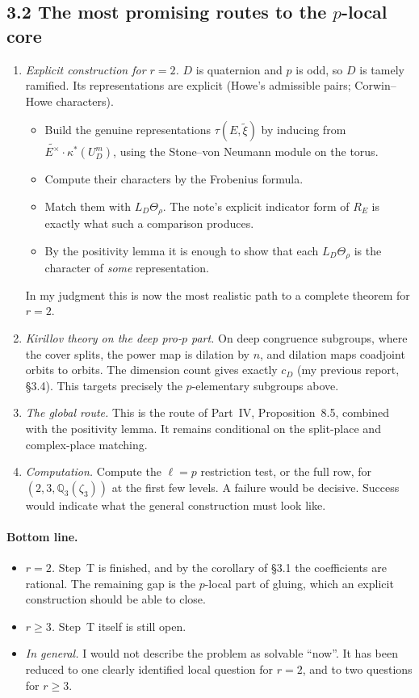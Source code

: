 \documentclass[11pt]{article}
\theoremstyle{plain}
\begin{document}
\subsection*{3.2 The most promising routes to the $p$-local core}
\begin{enumerate}[label=(\arabic*)]
\item \emph{Explicit construction for $r=2$.} $D$ is quaternion and
$p$ is odd, so $D$ is tamely ramified. Its representations are explicit
(Howe's admissible pairs; Corwin--Howe characters).
\begin{itemize}
\item Build the genuine representations $\tau(E,\tilde\xi)$ by inducing
from $\widetilde{E^\times}\cdot\kappa^*(U_D^m)$, using the
Stone--von Neumann module on the torus.
\item Compute their characters by the Frobenius formula.
\item Match them with $L_D\Theta_\rho$. The note's explicit indicator
form of $R_E$ is exactly what such a comparison produces.
\item By the positivity lemma it is enough to show that each
$L_D\Theta_\rho$ is the character of \emph{some} representation.
\end{itemize}
In my judgment this is now the most realistic path to a complete theorem
for $r=2$.
\item \emph{Kirillov theory on the deep pro-$p$ part.} On deep
congruence subgroups, where the cover splits, the power map is
dilation by $n$, and dilation maps coadjoint orbits to orbits. The
dimension count gives exactly $c_D$ (my previous report, \S3.4). This
targets precisely the $p$-elementary subgroups above.
\item \emph{The global route.} This is the route of Part~IV,
Proposition~8.5, combined with the positivity lemma. It remains
conditional on the split-place and complex-place matching.
\item \emph{Computation.} Compute the $\ell=p$ restriction test, or the
full row, for $(2,3,\mathbb Q_3(\zeta_3))$ at the first few levels. A
failure would be decisive. Success would indicate what the general
construction must look like.
\end{enumerate}

\paragraph{Bottom line.}
\begin{itemize}
\item \emph{$r=2$.} Step~T is finished, and by the corollary of \S3.1
the coefficients are rational. The remaining gap is the $p$-local part
of gluing, which an explicit construction should be able to close.
\item \emph{$r\ge3$.} Step~T itself is still open.
\item \emph{In general.} I would not describe the problem as solvable
``now''. It has been reduced to one clearly identified local question
for $r=2$, and to two questions for $r\ge3$.
\end{itemize}
\end{document}
